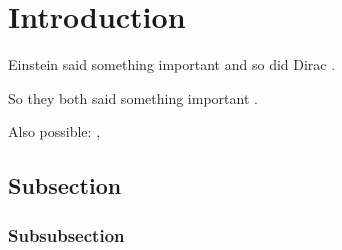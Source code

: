 \section{Introduction}




Einstein said something important \cite{einstein} and so did Dirac \cite{dirac}.

So they both said something important \cite{dirac,einstein}.

Also possible: \parencite{einstein}, \textcite{dirac}

\subsection{Subsection}
\subsubsection{Subsubsection}